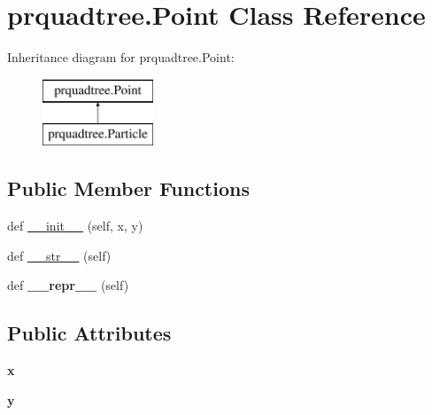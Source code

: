 \hypertarget{classprquadtree_1_1Point}{}\section{prquadtree.\+Point Class Reference}
\label{classprquadtree_1_1Point}
Inheritance diagram for prquadtree.\+Point\+:\begin{figure}[H]
\begin{center}
\leavevmode
\includegraphics[height=2.000000cm]{classprquadtree_1_1Point}
\end{center}
\end{figure}
\subsection*{Public Member Functions}
\begin{DoxyCompactItemize}
\item 
def \hyperlink{classprquadtree_1_1Point_a1179022b24fec8ea7a8e0a7e9e7f664d}{\+\_\+\+\_\+init\+\_\+\+\_\+} (self, x, y)
\item 
def \hyperlink{classprquadtree_1_1Point_ad33b3a05f6dce4daea0b307a42aa2453}{\+\_\+\+\_\+str\+\_\+\+\_\+} (self)
\item 
\hypertarget{classprquadtree_1_1Point_a8a9a5215cda0279f6958a0b55b4bc11d}{}def {\bfseries \+\_\+\+\_\+repr\+\_\+\+\_\+} (self)\label{classprquadtree_1_1Point_a8a9a5215cda0279f6958a0b55b4bc11d}

\end{DoxyCompactItemize}
\subsection*{Public Attributes}
\begin{DoxyCompactItemize}
\item 
\hypertarget{classprquadtree_1_1Point_a769eeb814487b26593281a720cc43813}{}{\bfseries x}\label{classprquadtree_1_1Point_a769eeb814487b26593281a720cc43813}

\item 
\hypertarget{classprquadtree_1_1Point_acc50fd274155e9a89996263a7e9f20db}{}{\bfseries y}\label{classprquadtree_1_1Point_acc50fd274155e9a89996263a7e9f20db}

\end{DoxyCompactItemize}


